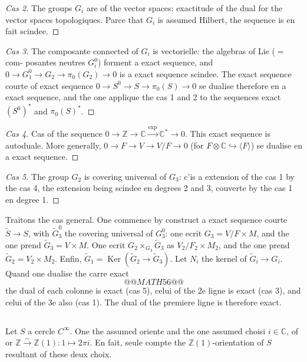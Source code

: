 \documentclass[12pt,a4paper]{article}
\theoremstyle{plain}
\theoremstyle{definition}
\theoremstyle{remark}
\DeclareMathOperator{\Ker}{Ker}
\newcommand{\Z}{\mathbb{Z}}
\newcommand{\C}{\mathbb{C}}
\providecommand{\Ker}{\operatorname{Ker}}
\begin{document}
\begin{proof}[Cas 2]
The groups $G_i$ are of the vector spaces: exactitude of the dual for the
vector spaces topologiques. Parce that $G_i$ is assumed Hilbert, the sequence is en fait
scindee.
\end{proof}

\begin{proof}[Cas 3]
The composante connected of $G_i$ is vectorielle: the algebras of Lie ($=$ com-
posantes neutres $G_i^0$) forment a exact sequence, and $0 \to G_1^0 \to G_2 \to \pi_0(G_2) \to 0$ is a
exact sequence scindee. The exact sequence courte of exact sequence $0 \to S^0 \to S \to \pi_0(S) \to 0$
se dualise therefore en a exact sequence, and the one applique the cas 1 and 2 to the sequences exact $(S^0)^*$
and $\pi_0(S)^*$.
\end{proof}

\begin{proof}[Cas 4]
Cas of the sequence $0 \to \Z \to \C \xrightarrow{\exp} \C^* \to 0$. This exact sequence is autoduale.
More generally, $0 \to F \to V \to V/F \to 0$ (for $F \otimes \C \hookrightarrow \langle F \rangle$) se dualise en a
exact sequence.
\end{proof}

\begin{proof}[Cas 5]
The group $G_2$ is covering universal of $G_3$: c'is a extension of the cas 1
by the cas 4, the extension being scindee en degrees 2 and 3, couverte by the cas 1 en degree 1.
\end{proof}

Traitons the cas general. One commence by construct a exact sequence courte $\tilde{S} \to S$,
with $\tilde{G}_3^0$ the covering universal of $G_3^0$: one ecrit $G_3 = V/F \times M$,
and the one prend $\tilde{G}_3 = V \times M$. One ecrit $G_2 \times_{G_3} \tilde{G}_3$ as $V_2/F_2 \times M_2$, and the one prend
$\tilde{G}_2 = V_2 \times M_2$. Enfin, $\tilde{G}_1 = \Ker(\tilde{G}_2 \to \tilde{G}_3)$. Let $N_i$ the kernel of $\tilde{G}_i \to G_i$. Quand
one dualise the carre exact
\[
@@MATH56@@
\]
the dual of each colonne is exact (cas 5), celui of the 2e ligne is exact (cas 3), and celui
of the 3e also (cas 1). The dual of the premiere ligne is therefore exact.

\subsection{}

Let $S$ a cercle $C^\infty$. One the assumed oriente and the one assumed choisi $i \in \C$, of or
$\Z \xrightarrow{\sim} \Z(1) : 1 \mapsto 2\pi i$. En fait, seule compte the $\Z(1)$-orientation of $S$ resultant of these
deux choix.
\end{document}
